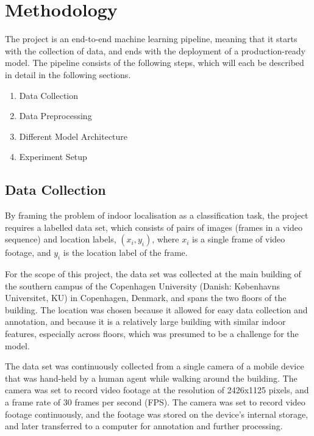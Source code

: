 \documentclass{article}
\begin{document}



  \section{Methodology} %
  \label{sec:methodology}

  The project is an end-to-end machine learning pipeline, meaning that it
  starts with the collection of data, and ends with the deployment of a
  production-ready model. The pipeline consists of the following steps, which
  will each be described in detail in the following sections.

  \begin{enumerate}
    \item Data Collection
    \item Data Preprocessing 
    \item Different Model Architecture
    \item Experiment Setup
  \end{enumerate}

  \subsection{Data Collection} %
  \label{sub:data-collection}

  By framing the problem of indoor localisation as a classification task, the
  project requires a labelled data set, which consists of pairs of images
  (frames in a video sequence) and location labels, $(x_i, y_i)$, where $x_i$ is
  a single frame of video footage, and $y_i$ is the location label of the frame.

  For the scope of this project, the data set was collected at the main building
  of the southern campus of the Copenhagen University (Danish: K\o{}benhavns
  Universitet, KU) in Copenhagen, Denmark, and spans the two floors of the
  building. The location was chosen because it allowed for easy data collection
  and annotation, and because it is a relatively large building with similar
  indoor features, especially across floors, which was presumed to be a
  challenge for the model.

  The data set was continuously collected from a single camera of a mobile
  device that was hand-held by a human agent while walking around the building.
  The camera was set to record video footage at the resolution of 2426x1125
  pixels, and a frame rate of 30 frames per second (FPS). The camera was set to
  record video footage continuously, and the footage was stored on the device's
  internal storage, and later transferred to a computer for annotation and
  further processing.
\end{document}
